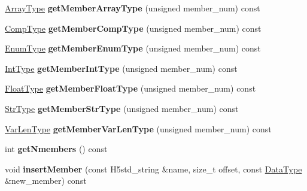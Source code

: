 \begin{DoxyCompactItemize}
\item 
\mbox{\label{class_h5_1_1_comp_type_a771e859b35902168305b6480223da278}} 
\hyperlink{class_h5_1_1_array_type}{Array\+Type} {\bfseries get\+Member\+Array\+Type} (unsigned member\+\_\+num) const
\item 
\mbox{\label{class_h5_1_1_comp_type_a0c8611eb67938e51af6f3eb97bc43f39}} 
\hyperlink{class_h5_1_1_comp_type}{Comp\+Type} {\bfseries get\+Member\+Comp\+Type} (unsigned member\+\_\+num) const
\item 
\mbox{\label{class_h5_1_1_comp_type_a14f4d70c2b66c6fa79110e2d59801752}} 
\hyperlink{class_h5_1_1_enum_type}{Enum\+Type} {\bfseries get\+Member\+Enum\+Type} (unsigned member\+\_\+num) const
\item 
\mbox{\label{class_h5_1_1_comp_type_a3b07df22e0dba85da9ac28ef641028d8}} 
\hyperlink{class_h5_1_1_int_type}{Int\+Type} {\bfseries get\+Member\+Int\+Type} (unsigned member\+\_\+num) const
\item 
\mbox{\label{class_h5_1_1_comp_type_a03fca3823e37761893510ea6a7abe183}} 
\hyperlink{class_h5_1_1_float_type}{Float\+Type} {\bfseries get\+Member\+Float\+Type} (unsigned member\+\_\+num) const
\item 
\mbox{\label{class_h5_1_1_comp_type_a1160cfbb4b058ff11ed7762e6a51954d}} 
\hyperlink{class_h5_1_1_str_type}{Str\+Type} {\bfseries get\+Member\+Str\+Type} (unsigned member\+\_\+num) const
\item 
\mbox{\label{class_h5_1_1_comp_type_acaa28388929b7b2041d5b0fc57c9aadb}} 
\hyperlink{class_h5_1_1_var_len_type}{Var\+Len\+Type} {\bfseries get\+Member\+Var\+Len\+Type} (unsigned member\+\_\+num) const
\item 
\mbox{\label{class_h5_1_1_comp_type_ad90c401dfdc0c6d44e22f25c358c2ae0}} 
int {\bfseries get\+Nmembers} () const
\item 
\mbox{\label{class_h5_1_1_comp_type_a5ccddf9f47c8d9007b1be6dad4385935}} 
void {\bfseries insert\+Member} (const H5std\+\_\+string \&name, size\+\_\+t offset, const \hyperlink{class_h5_1_1_data_type}{Data\+Type} \&new\+\_\+member) const

\end{DoxyCompactItemize}
